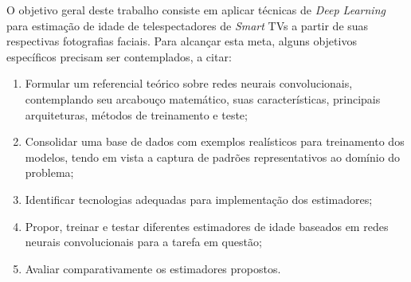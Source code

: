 O objetivo geral deste trabalho consiste em aplicar técnicas de \emph{Deep Learning} para estimação de idade de telespectadores de  \emph{Smart} TVs a partir de suas respectivas fotografias faciais. Para alcançar esta meta, alguns objetivos específicos precisam ser contemplados, a citar:

\begin{enumerate}
     \item Formular um referencial teórico sobre redes neurais convolucionais, contemplando seu arcabouço matemático, suas características, principais arquiteturas, métodos de treinamento e teste;
     \item Consolidar uma base de dados com exemplos realísticos para treinamento dos modelos, tendo em vista a captura de padrões representativos ao domínio do problema;
     \item Identificar tecnologias adequadas para implementação dos estimadores;
     \item Propor, treinar e testar diferentes estimadores de idade baseados em redes neurais convolucionais para a tarefa em questão;
     \item Avaliar comparativamente os estimadores propostos.
\end{enumerate}
